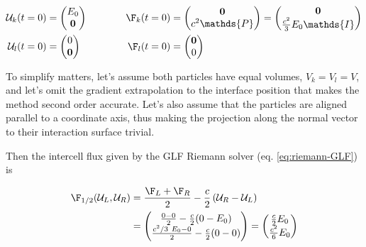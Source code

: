 \begin{align}
    \mathcal{U}_k(t = 0) &= \left( \begin{matrix}
                    E_0 \\
                    \mathbf{0}
                  \end{matrix} \right)
    \quad & \quad \quad
    \F_k(t = 0)  &= \left( \begin{matrix}
                   \mathbf{0} \\
                   c^2 \mathds{P}
                  \end{matrix} \right)
                = \left( \begin{matrix}
                   \mathbf{0} \\
                   \frac{c^2}{3} E_0 \mathds{I}
                  \end{matrix} \right)\\
%
    \mathcal{U}_l(t = 0) &= \left( \begin{matrix}
                    0 \\
                    \mathbf{0}
                  \end{matrix} \right)
    \quad & \quad \quad
    \F_l(t = 0)  &= \left( \begin{matrix}
                   \mathbf{0} \\
                   0
                  \end{matrix} \right)
\end{align}

To simplify matters, let's assume both particles have equal volumes, $V_k = V_l = V$, and let's
omit the gradient extrapolation to the interface position that makes the method second order
accurate. Let's also assume that the particles are aligned parallel to a coordinate axis,  thus
making the projection along the normal vector to their interaction surface trivial.

Then the intercell flux given by the GLF Riemann solver (eq. \ref{eq:riemann-GLF}) is

\begin{align}
	\F_{1/2}(\mathcal{U}_L, \mathcal{U}_R) &=
		\frac{\F_{L} + \F_{R}}{2} -
		\frac{c}{2} \left(\mathcal{U}_R - \mathcal{U}_L \right) \\
	&=	\left(\begin{matrix}
        \frac{0 - 0}{2} - \frac{c}{2} (0 - E_0)\\
        \frac{c^2 / 3 \ E_0 - 0}{2} - \frac{c}{2} (0 -0)
	  	\end{matrix} \right)
	=	\left(\begin{matrix}
        \frac{c}{2} E_0 \\
        \frac{c^2}{6} E_0
	  	\end{matrix} \right)
\end{align}

